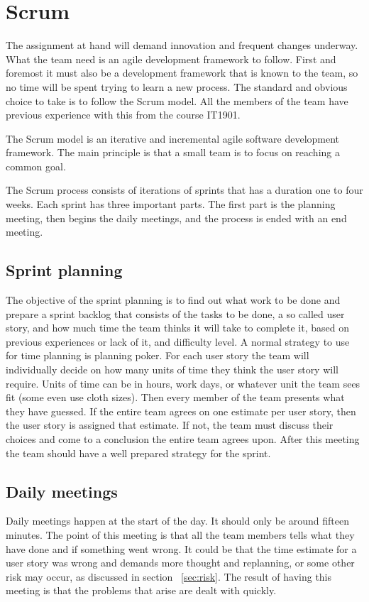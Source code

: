 \section{Scrum}

The assignment at hand will demand innovation and frequent changes underway.
What the team need is an agile development framework to follow. First and foremost it must also be a development framework that is known to the team,
so no time will be spent trying to learn a new process.
The standard and obvious choice to take is to follow the Scrum model. All the members of the team have previous experience with this from the course IT1901.

The Scrum model is an iterative and incremental agile software development framework.
The main principle is that a small team is to focus on reaching a common goal.

The Scrum process consists of iterations of sprints that has a duration one to four weeks. Each sprint has three important parts.
The first part is the planning meeting, then begins the daily  meetings, and the process is ended with an end meeting.

\subsection{Sprint planning}
The objective of the sprint planning is to find out what work to be done and prepare a
sprint backlog that consists of the tasks to be done, a so called user story, and how much time the team thinks it will take to complete it, based on previous experiences or lack of it, and difficulty level. A normal strategy to use for time planning is
planning poker. For each user story the team will individually decide on how many units of time they think the user story will require. Units of time can be in hours, work days, or whatever unit the team sees fit (some even use cloth sizes).
Then every member of the team presents what they have guessed. If the entire team agrees on one estimate per user story, then the user story is assigned that estimate. If not, the team must discuss their choices and come to a conclusion the entire team agrees upon.
After this meeting the team should have a well prepared strategy for the sprint.

\subsection{Daily meetings}
Daily meetings happen at the start of the day. It should only be around fifteen minutes. The point of this meeting is that all the team members tells what they have done and if something went wrong.
It could be that the time estimate for a user story was wrong and demands more thought and replanning, or some other risk may occur, as discussed in section ~\ref{sec:risk}. The result of having this meeting is that the problems that arise are dealt with quickly.

